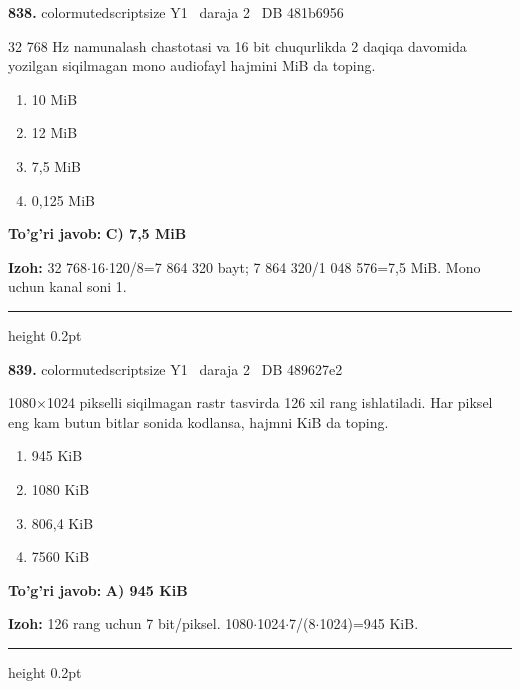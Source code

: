 \documentclass[10pt,a4paper,oneside]{article}
\begin{document}
\noindent\textbf{\color{ink}838.}  {color{muted}scriptsize Y1 \textbullet\ daraja 2 \textbullet\ DB 481b6956}
\par
32 768 Hz namunalash chastotasi va 16 bit chuqurlikda 2 daqiqa davomida yozilgan siqilmagan mono audiofayl hajmini MiB da toping.
\begin{enumerate}[label=\Alph*),leftmargin=9mm]
\item 10 MiB
\item 12 MiB
\item 7,5 MiB
\item 0,125 MiB
\end{enumerate}
\begin{tcolorbox}[enhanced,breakable,colback=teal!4,colframe=teal!50!black,boxrule=0.5pt,arc=1.1mm,left=3mm,right=3mm,top=1.7mm,bottom=1.7mm,before skip=2mm,after skip=2mm]
\textbf{\color{teal}To'g'ri javob:} \textbf{C) 7,5 MiB}
\par\smallskip
\textbf{Izoh:} 32 768\ensuremath{\cdot}16\ensuremath{\cdot}120/8=7 864 320 bayt; 7 864 320/1 048 576=7,5 MiB. Mono uchun kanal soni 1.
\end{tcolorbox}
\vspace{2mm}\hrule height 0.2pt \vspace{3mm}

\noindent\textbf{\color{ink}839.}  {color{muted}scriptsize Y1 \textbullet\ daraja 2 \textbullet\ DB 489627e2}
\par
1080\ensuremath{\times}1024 pikselli siqilmagan rastr tasvirda 126 xil rang ishlatiladi. Har piksel eng kam butun bitlar sonida kodlansa, hajmni KiB da toping.
\begin{enumerate}[label=\Alph*),leftmargin=9mm]
\item 945 KiB
\item 1080 KiB
\item 806,4 KiB
\item 7560 KiB
\end{enumerate}
\begin{tcolorbox}[enhanced,breakable,colback=teal!4,colframe=teal!50!black,boxrule=0.5pt,arc=1.1mm,left=3mm,right=3mm,top=1.7mm,bottom=1.7mm,before skip=2mm,after skip=2mm]
\textbf{\color{teal}To'g'ri javob:} \textbf{A) 945 KiB}
\par\smallskip
\textbf{Izoh:} 126 rang uchun 7 bit/piksel. 1080\ensuremath{\cdot}1024\ensuremath{\cdot}7/(8\ensuremath{\cdot}1024)=945 KiB.
\end{tcolorbox}
\vspace{2mm}\hrule height 0.2pt \vspace{3mm}
\end{document}
